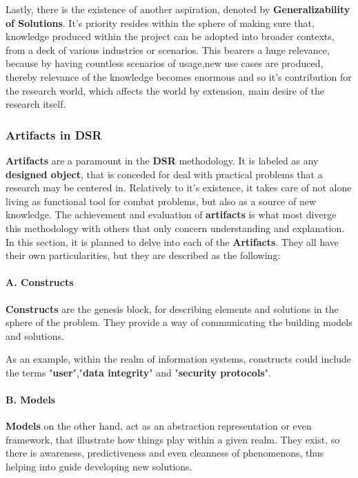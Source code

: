 Lastly, there is the existence of another aspiration, denoted by \textbf{Generalizability of Solutions}. It's priority resides within the sphere of making sure that, knowledge produced within the project can be adopted into broader contexts, from a deck of various industries or scenarios. This bearers a huge relevance, because by having countless scenarios of usage,new use cases are produced, thereby relevance of the knowledge becomes enormous and so it's contribution for the research world, which affects the world by extension, main desire of the research itself.

\subsubsection{Artifacts in DSR}
\textbf{Artifacts} are a paramount in the \textbf{DSR} methodology. It is labeled as any \textbf{designed object}, that is conceded for deal with practical problems that a research may be centered in. Relatively to it's existence, it takes care of not alone living as functional tool for combat problems, but also as a source of new knowledge. The achievement and evaluation of \textbf{artifacts} is what most diverge this methodology with others that only concern understanding and explanation.
In this section, it is planned to delve into each of the \textbf{Artifacts}. They all have their own particularities, but they are described as the following:

\paragraph{A. Constructs}\mbox{}

\textbf{Constructs} are the genesis block, for describing elements and solutions in the sphere of the problem. They provide a way of communicating the building models and solutions.

As an example, within the realm of information systems, constructs could include the terms "\textbf{user}","\textbf{data integrity}" and "\textbf{security protocols}".

\paragraph{B. Models}\mbox{}

\textbf{Models} on the other hand, act as an abstraction representation or even framework, that illustrate how things play within a given realm. They exist, so there is awareness, predictiveness and even cleanness of phenomenons, thus helping into guide developing new solutions.

